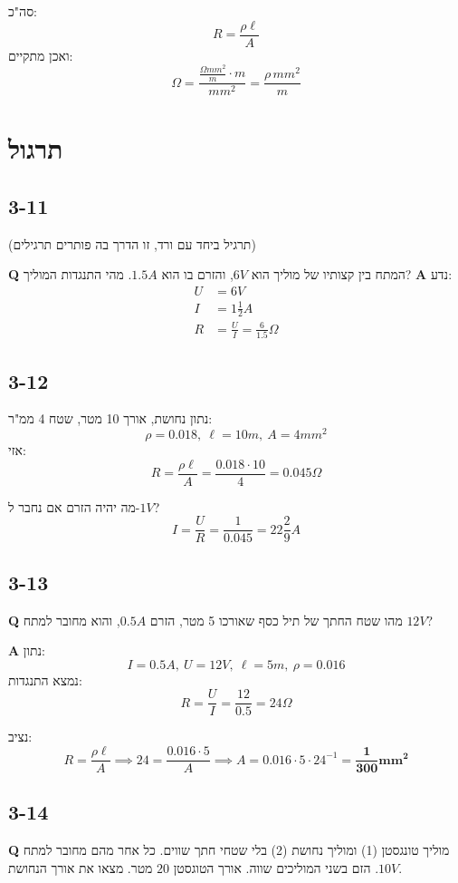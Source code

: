 \documentclass[]{article}
\newcommand\op    {^{-1}}
\begin{document}
	סה"כ: 
	\[ R = \frac{\rho \ell}{A} \]
	ואכן מתקיים: 
	\[ \Omega = \frac{\frac{\Omega mm^2}{m} \cdot m}{mm^2} = \frac{\rho \, mm^2}{m} \]
	
	\section{תרגול}
	
	\subsection*{3-11}
	(תרגיל ביחד עם ורד, זו הדרך בה פותרים תרגילים)
	
	\textbf{Q }המתח בין קצותיו של מוליך הוא $6V$, והזרם בו הוא $1.5A$. מהי התנגדות המוליך? 
	\textbf{A }נדע: 
	\begin{align*}
		U&=6V \\
		I&=1\frac{1}{2}A \\
		R&=\frac{U}{I}  = \frac{6}{1.5}\Omega
	\end{align*}
	
	\subsection*{3-12}
	
	נתון נחושת, אורך 10 מטר, שטח 4 ממ"ר: 
	\[ \rho = 0.018, \ \ell = 10m, \ A = 4mm^2 \]
	אזי: 
	\[ R = \frac{\rho \ell}{A} = \frac{0.018 \cdot 10}{4} = 0.045 \Omega \]
	
	מה יהיה הזרם אם נחבר ל-$1V$? 
	\[ I = \frac{U}{R} = \frac{1}{0.045} = 22\frac{2}{9}A \]
	
	\subsection*{3-13}
	
	\textbf{Q }מהו שטח החתך של תיל כסף שאורכו 5 מטר, הזרם $0.5A$, והוא מחובר למתח $12V$? 
	
	\textbf{A }
	נתון: 
	\[ I = 0.5A, \ U = 12V, \ \ell = 5m, \ \rho = 0.016 \]
	נמצא התנגדות: 
	\[ R = \frac{U}{I} = \frac{12}{0.5} = 24\Omega \]
	
	נציב: 
	\[ R = \frac{\rho \ell}{A} \implies 24 = \frac{0.016 \cdot 5}{A} \implies A = 0.016 \cdot 5 \cdot 24\op = \bm{\frac{1}{300}mm^2} \]
	
	\subsection*{3-14}
	
	\textbf{Q} מוליך טונגסטן (1) ומוליך נחושת (2) בלי שטחי חתך שווים. כל אחר מהם מחובר למתח $10V$. הזם בשני המוליכים שווה. אורך הטוגסטן $20$ מטר. מצאו את אורך הנחושת. 
	
\end{document}
